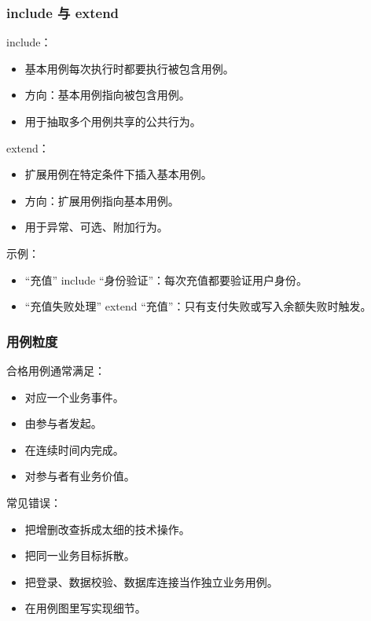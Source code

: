 \documentclass[UTF8,zihao=-4]{ctexart}
\begin{document}
\subsubsection{include 与 extend}

include：

\begin{itemize}
\item 基本用例每次执行时都要执行被包含用例。
\item 方向：基本用例指向被包含用例。
\item 用于抽取多个用例共享的公共行为。
\end{itemize}

extend：

\begin{itemize}
\item 扩展用例在特定条件下插入基本用例。
\item 方向：扩展用例指向基本用例。
\item 用于异常、可选、附加行为。
\end{itemize}

示例：

\begin{itemize}
\item “充值” include “身份验证”：每次充值都要验证用户身份。
\item “充值失败处理” extend “充值”：只有支付失败或写入余额失败时触发。
\end{itemize}

\subsubsection{用例粒度}

合格用例通常满足：

\begin{itemize}
\item 对应一个业务事件。
\item 由参与者发起。
\item 在连续时间内完成。
\item 对参与者有业务价值。
\end{itemize}

常见错误：

\begin{itemize}
\item 把增删改查拆成太细的技术操作。
\item 把同一业务目标拆散。
\item 把登录、数据校验、数据库连接当作独立业务用例。
\item 在用例图里写实现细节。
\end{itemize}
\end{document}
